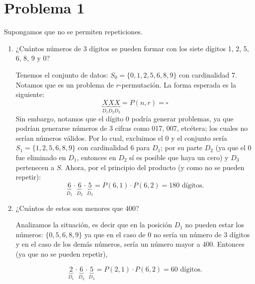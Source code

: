 \section{Problema 1}

Supongamos que no se permiten repeticiones.
\begin{enumerate}
    \item ¿Cuántos números de 3 dígitos se pueden formar con los siete dígitos 1, 2, 5, 6, 8, 9 y 0?
    \begin{solution} Tenemos el conjunto de datos: $S_0= \{0,1,2,5,6,8,9\}$ con cardinalidad 7. Notamos que es un problema de $r$-permutación. La forma esperada es la siguiente: 
    $$\underbrace{X}_{D_1}\underbrace{X}_{D_2} \underbrace{X}_{D_3}=P(n,r)=\square$$
     Sin embargo, notamos que el dígito 0 podría generar problemas, ya que podrían generarse números de 3 cifras como 017, 007, etcétera; los cuales no serían números válidos. Por lo cual, excluimos el 0 y el conjunto sería $S_1= \{1,2,5,6,8,9\}$ con cardinalidad 6 para $D_1$; por su parte $D_2$ (ya que el 0 fue eliminado en $D_1$, entonces en $D_2$ sí es posible que haya un cero) y $D_3$ pertenecen a $S$. Ahora, por el principio del producto (y como no se pueden repetir):  
    $$\underbrace{6}_{D_1}\cdot \underbrace{6}_{D_2}\cdot \underbrace{5}_{D_3}=P(6,1)\cdot P(6,2)=180 \text{ dígitos.}$$
    \end{solution}
    \item ¿Cuántos de estos son menores que 400?
    \begin{solution}
    Analizamos la situación, es decir que en la posición $D_1$ no pueden estar los números: $\{0,5,6,8,9\}$ ya que en el caso de $0$ no sería un número de 3 dígitos y en el caso de los demás números, sería un número mayor a 400. Entonces (ya que no se pueden repetir), 
    
    $$\underbrace{2}_{D_1}\cdot \underbrace{6}_{D_2}\cdot \underbrace{5}_{D_3}=P(2,1)\cdot P(6,2)=60 \text{ dígitos.}$$
    \end{solution} 
\end{enumerate}